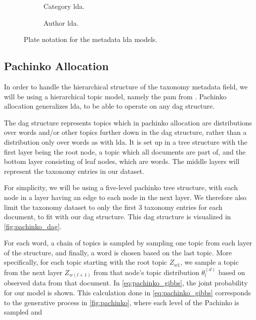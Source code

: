 \begin{figure*}[ht]
	\centering
	\begin{subfigure}{0.3\textwidth}
		\centering
		
		\caption{Category \gls{lda}.}
		\label{fig:category_lda}
	\end{subfigure}
	\hspace{5em}
	\begin{subfigure}{0.3\textwidth}
		\centering
		
		\caption{Author \gls{lda}.}
		\label{fig:author_lda}
	\end{subfigure}
	\caption{Plate notation for the metadata \gls{lda} models.}
	\label{fig:metadata_lda}
\end{figure*}

\subsection{Pachinko Allocation}
In order to handle the hierarchical structure of the taxonomy metadata field, we will be using a hierarchical topic model, namely the \acrlong{pam} from \citet{li2006pachinko}.
Pachinko allocation generalizes \gls{lda}, to be able to operate on any \gls{dag} structure.

The \gls{dag} structure represents topics which in pachinko allocation are distributions over words and/or other topics further down in the \gls{dag} structure, rather than a distribution only over words as with \gls{lda}.
It is set up in a tree structure with the first layer being the root node, a topic which all documents are part of, and the bottom layer consisting of leaf nodes, which are words.
The middle layers will represent the taxonomy entries in our dataset.

For simplicity, we will be using a five-level pachinko tree structure, with each node in a layer having an edge to each node in the next layer.
We therefore also limit the taxonomy dataset to only the first $3$ taxonomy entries for each document, to fit with our \gls{dag} structure.
This \gls{dag} structure is visualized in \autoref{fig:pachinko_dag}.

For each word, a chain of topics is sampled by sampling one topic from each layer of the structure, and finally, a word is chosen based on the last topic.
More specifically, for each topic starting with the root topic $Z_{w1}$, we sample a topic from the next layer $Z_{w(l+1)}$ from that node's topic distribution $\theta_l^{(d)}$ based on observed data from that document.
In \autoref{eq:pachinko_gibbs}, the joint probability for our model is shown.
This calculation done in \autoref{eq:pachinko_gibbs} corresponds to the generative process in \autoref{fig:pachinko}, where each level of the Pachinko is sampled and 


